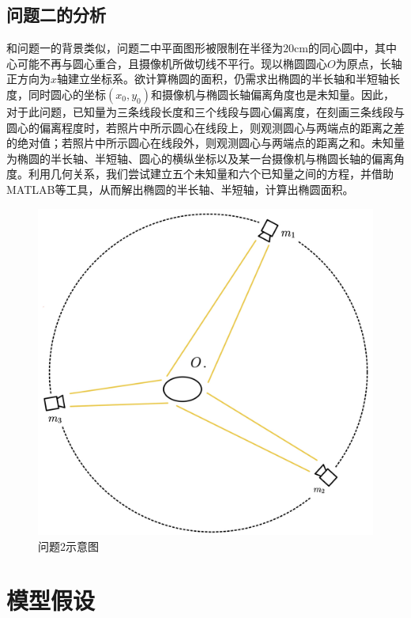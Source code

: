 \documentclass[a4paper,10.5pt]{ctexart}
\begin{document}
\subsection{问题二的分析}
\par 和问题一的背景类似，问题二中平面图形被限制在半径为$20$cm的同心圆中，其中心可能不再与圆心重合，且摄像机所做切线不平行。现以椭圆圆心$O$为原点，长轴正方向为$x$轴建立坐标系。欲计算椭圆的面积，仍需求出椭圆的半长轴和半短轴长度，同时圆心的坐标$(x_0,y_0)$和摄像机与椭圆长轴偏离角度也是未知量。因此，对于此问题，已知量为三条线段长度和三个线段与圆心偏离度，在刻画三条线段与圆心的偏离程度时，若照片中所示圆心在线段上，则观测圆心与两端点的距离之差的绝对值；若照片中所示圆心在线段外，则观测圆心与两端点的距离之和。未知量为椭圆的半长轴、半短轴、圆心的横纵坐标以及某一台摄像机与椭圆长轴的偏离角度。利用几何关系，我们尝试建立五个未知量和六个已知量之间的方程，并借助MATLAB等工具，从而解出椭圆的半长轴、半短轴，计算出椭圆面积。
\begin{figure}[h]%
\centering
\includegraphics[scale=0.15]{问题2图示.jpg}
\caption{问题2示意图}

\label{fig:label}
\end{figure}
\section{模型假设}
\end{document}
